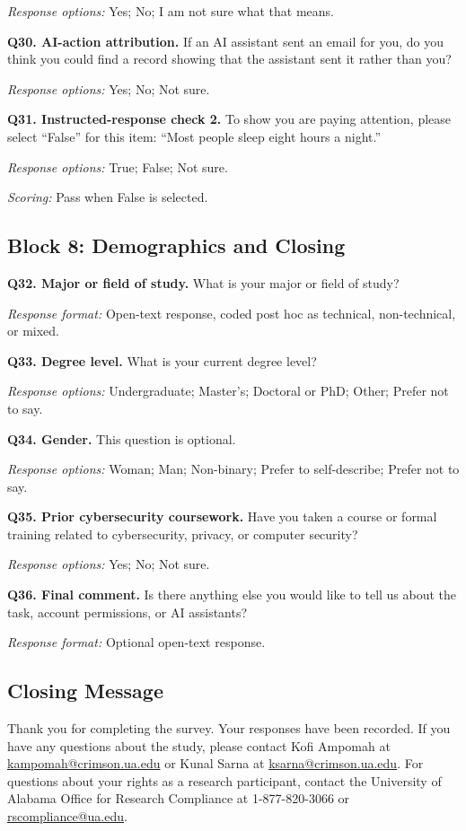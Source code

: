 \documentclass[11pt]{article}
\begin{document}
\textit{Response options:} Yes; No; I am not sure what that means.

\textbf{Q30. AI-action attribution.}
If an AI assistant sent an email for you, do you think you could find a record
showing that the assistant sent it rather than you?

\textit{Response options:} Yes; No; Not sure.

\textbf{Q31. Instructed-response check 2.}
To show you are paying attention, please select ``False'' for this item:
``Most people sleep eight hours a night.''

\textit{Response options:} True; False; Not sure.

\textit{Scoring:} Pass when False is selected.

\subsection*{Block 8: Demographics and Closing}

\textbf{Q32. Major or field of study.}
What is your major or field of study?

\textit{Response format:} Open-text response, coded post hoc as technical,
non-technical, or mixed.

\textbf{Q33. Degree level.}
What is your current degree level?

\textit{Response options:} Undergraduate; Master's; Doctoral or PhD; Other;
Prefer not to say.

\textbf{Q34. Gender.} This question is optional.

\textit{Response options:} Woman; Man; Non-binary; Prefer to self-describe;
Prefer not to say.

\textbf{Q35. Prior cybersecurity coursework.}
Have you taken a course or formal training related to cybersecurity, privacy,
or computer security?

\textit{Response options:} Yes; No; Not sure.

\textbf{Q36. Final comment.}
Is there anything else you would like to tell us about the task, account
permissions, or AI assistants?

\textit{Response format:} Optional open-text response.

\subsection*{Closing Message}

Thank you for completing the survey. Your responses have been recorded. If you
have any questions about the study, please contact Kofi Ampomah at
\href{mailto:kampomah@crimson.ua.edu}{kampomah@crimson.ua.edu} or Kunal Sarna
at \href{mailto:ksarna@crimson.ua.edu}{ksarna@crimson.ua.edu}. For questions
about your rights as a research participant, contact the University of Alabama
Office for Research Compliance at 1-877-820-3066 or
\href{mailto:rscompliance@ua.edu}{rscompliance@ua.edu}.



\end{document}
